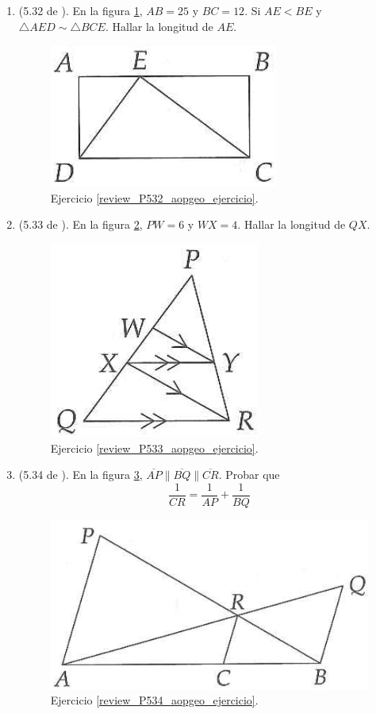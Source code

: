 \begin{enumerate}
		\item \label{review_P532_aopgeo_ejercicio} (5.32 de \cite{Aops_Geometria}). En la figura \ref{review_532_aopgeo_ejer}, $AB=25$ y $BC=12$. Si $AE<BE$ y $\triangle AED \sim \triangle BCE$. Hallar la longitud de $AE$.
		\begin{figure}[H]
			\centering
			\includegraphics[width=0.35\linewidth]{Geometria/imgs/review_532_aopgeo_ejer}
			\caption{Ejercicio \ref{review_P532_aopgeo_ejercicio}.}
			\label{review_532_aopgeo_ejer}
		\end{figure}
		
		\item \label{review_P533_aopgeo_ejercicio} (5.33 de \cite{Aops_Geometria}). En la figura \ref{review_533_aopgeo_ejer}, $PW=6$ y $WX=4$. Hallar la longitud de $QX$.
		\begin{figure}[H]
			\centering
			\includegraphics[width=0.35\linewidth]{Geometria/imgs/review_533_aopgeo_ejer}
			\caption{Ejercicio \ref{review_P533_aopgeo_ejercicio}.}
			\label{review_533_aopgeo_ejer}
		\end{figure}
		
		\item \label{review_P534_aopgeo_ejercicio} (5.34 de \cite{Aops_Geometria}). En la figura \ref{review_534_aopgeo_ejer}, $\overline{AP} \parallel \overline{BQ} \parallel \overline{CR}$. Probar que
		\[
				\frac{1}{CR} = \frac{1}{AP} + \frac{1}{BQ}
		\]
		\begin{figure}[H]
			\centering
			\includegraphics[width=0.45\linewidth]{Geometria/imgs/review_534_aopgeo_ejer}
			\caption{Ejercicio \ref{review_P534_aopgeo_ejercicio}.}
			\label{review_534_aopgeo_ejer}
		\end{figure}
		

\end{enumerate}
